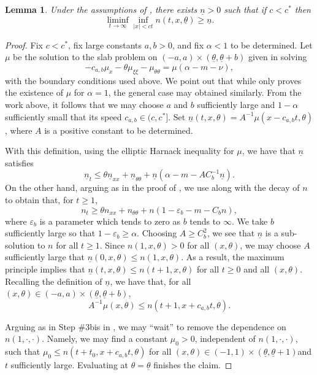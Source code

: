 \documentclass[11pt]{article}    %
\newtheorem{lem}[theorem]{Lemma}
\renewcommand{\epsilon}{\varepsilon}
\begin{document}
\begin{lem}\label{lem:finite_speed_lower_bd}
	Under the assumptions of , there exists $\underline n>0$ such that if $c < c^*$ then %
	\[
		\liminf_{t\to\infty} \inf_{|x| < ct} n(t,x,\underline\theta) \geq \underline n.
	\]
\end{lem}
\begin{proof}%
Fix $c < c^*$, fix large constants $a,b>0$, and fix $\alpha< 1$ to be determined.  Let $\mu$ be the solution to the slab problem on $(-a,a)\times(\underline\theta,\underline\theta+b)$ given in  solving
\[
	- c_{a,b} \mu_x - \theta \mu_{\xi\xi} - \mu_{\theta\theta} = \mu(\alpha - m - \nu),
\]
with the boundary conditions used above.  We point out that while  only proves the existence of $\mu$ for $\alpha = 1$, the general case may obtained similarly.  From the work above, it follows that we may choose $a$ and $b$ sufficiently large and $1-\alpha$ sufficiently small that its speed $c_{a,b} \in (c,c^*]$.  Set $\underline n (t,x,\theta) = A^{-1}\mu(x - c_{a,b}t , \theta)$, where $A$ is a positive constant to be determined.

With this definition, using the elliptic Harnack inequality for $\mu$, we have that $\underline n$ satisfies
\[
	\underline n_t \leq \theta \underline n_{xx} + \underline n_{\theta\theta} + \underline n (\alpha - m - A C_b^{-1} \underline n).
\]
On the other hand, arguing as in the proof of , we use  along with the decay of $n$ to obtain that, for $t\geq 1$,
\[
	n_t \geq \theta n_{xx} + n_{\theta\theta} + n(1 -\epsilon_b - m - C_b n),
\]
where $\epsilon_b$ is a parameter which tends to zero as $b$ tends to $\infty$.  We take $b$ sufficiently large so that $1-\epsilon_b \geq \alpha$.  Choosing $A \geq C_b^2$, we see that $\underline n$ is a sub-solution to $n$ for all $t \geq 1$.  Since $n(1,x,\theta) > 0$ for all $(x,\theta)$, we may choose $A$ sufficiently large that $\underline n(0,x,\theta) \leq n(1,x,\theta)$.  As a result, the maximum principle implies that $\underline n(t,x,\theta) \leq n(t+1,x,\theta)$ for all $t\geq 0$ and all $(x,\theta)$.  Recalling the definition of $\underline n$, we have that, for all $(x,\theta) \in (-a,a)\times(\underline\theta,\underline\theta+b)$,
\[
	A^{-1} \mu(x, \theta) \leq n(t+1, x + c_{a,b}t, \theta).
\]

Arguing as in Step \#3bis in , we may ``wait'' to remove the dependence on $n(1,\cdot,\cdot)$.  Namely, we may find a constant $\mu_0>0$, independent of $n(1,\cdot,\cdot)$, such that $\mu_0 \leq n(t + t_0, x + c_{a,b} t, \theta)$ for all $(x,\theta) \in (-1,1)\times (\underline\theta, \underline \theta+1)$and $t$ sufficiently large. Evaluating at $\theta = \underline\theta$ finishes the claim.\end{proof}
\end{document}

